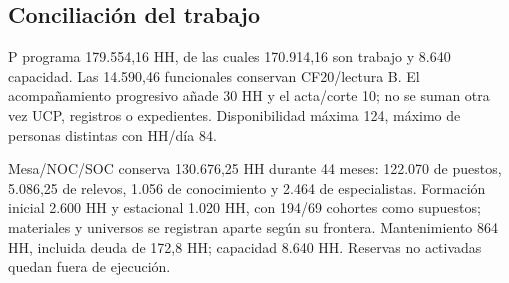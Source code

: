 \subsection{Conciliación del trabajo}
P programa 179.554,16 HH, de las cuales 170.914,16 son trabajo y 8.640 capacidad. Las 14.590,46 funcionales conservan CF20/lectura B. El acompañamiento progresivo añade 30 HH y el acta/corte 10; no se suman otra vez UCP, registros o expedientes. Disponibilidad máxima 124, máximo de personas distintas con HH/día 84.

Mesa/NOC/SOC conserva 130.676,25 HH durante 44 meses: 122.070 de puestos, 5.086,25 de relevos, 1.056 de conocimiento y 2.464 de especialistas. Formación inicial 2.600 HH y estacional 1.020 HH, con 194/69 cohortes como supuestos; materiales y universos se registran aparte según su frontera. Mantenimiento 864 HH, incluida deuda de 172,8 HH; capacidad 8.640 HH. Reservas no activadas quedan fuera de ejecución.


